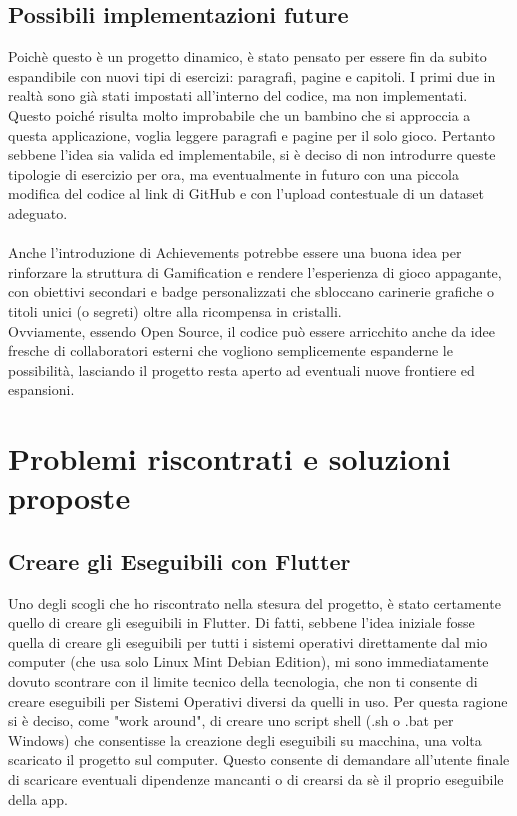 \documentclass[14pt]{extbook}
\begin{document}
\section{Possibili implementazioni future}
Poichè questo è un progetto dinamico, è stato pensato per essere fin da subito espandibile con nuovi tipi di esercizi: paragrafi, pagine e capitoli. I primi due in realtà sono già stati impostati all'interno del codice, ma non implementati. Questo poiché risulta molto improbabile che un bambino che si approccia a questa applicazione, voglia leggere paragrafi e pagine per il solo gioco. Pertanto sebbene l'idea sia valida ed implementabile, si è deciso di non introdurre queste tipologie di esercizio per ora, ma eventualmente in futuro con una piccola modifica del codice al link di GitHub e con l'upload contestuale di un dataset adeguato.\\\\

Anche l'introduzione di Achievements potrebbe essere una buona idea per rinforzare la struttura di Gamification e rendere l'esperienza di gioco appagante, con obiettivi secondari e badge personalizzati che sbloccano carinerie grafiche o titoli unici (o segreti) oltre alla ricompensa in cristalli.\\ 

Ovviamente, essendo Open Source, il codice può essere arricchito anche da idee fresche di collaboratori esterni che vogliono semplicemente espanderne le possibilità, lasciando il progetto resta aperto ad eventuali nuove frontiere ed espansioni.\\
\clearpage
\chapter{Problemi riscontrati e soluzioni proposte}
\section{Creare gli Eseguibili con Flutter}
Uno degli scogli che ho riscontrato nella stesura del progetto, è stato certamente quello di creare gli eseguibili in Flutter. Di fatti, sebbene l'idea iniziale fosse quella di creare gli eseguibili per tutti i sistemi operativi direttamente dal mio computer (che usa solo Linux Mint Debian Edition), mi sono immediatamente dovuto scontrare con il limite tecnico della tecnologia, che non ti consente di creare eseguibili per Sistemi Operativi diversi da quelli in uso. Per questa ragione si è deciso, come "work around", di creare uno script shell (.sh o .bat per Windows) che consentisse la creazione degli eseguibili su macchina, una volta scaricato il progetto sul computer. Questo consente di demandare all'utente finale di scaricare eventuali dipendenze mancanti o di crearsi da sè il proprio eseguibile della app. 
\pagebreak
\end{document}
